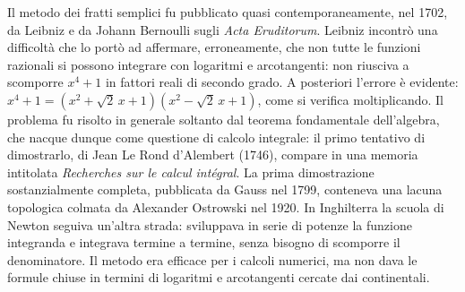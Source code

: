 \begin{notastorica}
Il metodo dei fratti semplici fu pubblicato quasi contemporaneamente, nel 1702, da
Leibniz e da Johann Bernoulli sugli \emph{Acta Eruditorum}. Leibniz incontrò una
difficoltà che lo portò ad affermare, erroneamente, che non tutte le funzioni razionali
si possono integrare con logaritmi e arcotangenti: non riusciva a scomporre $x^{4}+1$ in
fattori reali di secondo grado. A posteriori l'errore è evidente:
$x^{4}+1=(x^{2}+\sqrt2\,x+1)(x^{2}-\sqrt2\,x+1)$, come si verifica moltiplicando. Il
problema fu risolto in generale soltanto dal teorema fondamentale dell'algebra, che nacque
dunque come questione di calcolo integrale: il primo tentativo di dimostrarlo, di Jean Le
Rond d'Alembert (1746), compare in una memoria intitolata \emph{Recherches sur le calcul
intégral}. La prima dimostrazione sostanzialmente completa, pubblicata da Gauss nel 1799,
conteneva una lacuna topologica colmata da Alexander Ostrowski nel 1920. In Inghilterra la
scuola di Newton seguiva un'altra strada: sviluppava in serie di potenze la funzione
integranda e integrava termine a termine, senza bisogno di scomporre il denominatore. Il
metodo era efficace per i calcoli numerici, ma non dava le formule chiuse in termini di
logaritmi e arcotangenti cercate dai continentali.
\end{notastorica}
